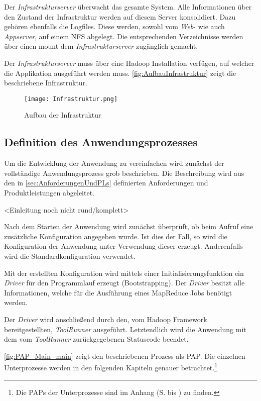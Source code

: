Der \textit{Infrastrukturserver} überwacht das gesamte System. Alle Informationen über den Zustand der Infrastruktur werden auf diesem Server konsolidiert. Dazu gehören ebenfalls die Logfiles. Diese werden, sowohl vom \textit{Web}- wie auch \textit{Appserver}, auf einem \ac{NFS} abgelegt. Die entsprechenden Verzeichnisse werden über einen mount dem \textit{Infrastrukturserver} zugänglich gemacht. 

Der \textit{Infrastrukturserver} muss über eine Hadoop Installation verfügen, auf welcher die Applikation ausgeführt werden muss. \autoref{fig:AufbauInfrastruktur} zeigt die beschriebene Infrastruktur. \\

\begin{figure}[h]
	\centering
	\texttt{[image: Infrastruktur.png]}
	\caption{Aufbau der Infrastruktur}
	\label{fig:AufbauInfrastruktur}
\end{figure}

\subsection{Definition des Anwendungsprozesses}
Um die Entwicklung der Anwendung zu vereinfachen wird zunächst der vollständige Anwendungsprozess grob beschrieben. Die Beschreibung wird aus den in \autoref{sec:AnforderungenUndPLs} definierten Anforderungen und Produktleistungen abgeleitet.

<Einleitung noch nicht rund/komplett>

Nach dem Starten der Anwendung wird zunächst überprüft, ob beim Aufruf eine zusätzliche Konfiguration angegeben wurde. Ist dies der Fall, so wird die Konfiguration der Anwendung unter Verwendung dieser erzeugt. Anderenfalls wird die Standardkonfiguration verwendet.

Mit der erstellten Konfiguration wird mittels einer Initialisierungsfunktion ein \textit{Driver} für den Programmlauf erzeugt (\gls{Bootstrapping}). Der \textit{Driver} besitzt alle Informationen, welche für die Ausführung eines MapReduce Jobs benötigt werden.

Der \textit{Driver} wird anschließend durch den, vom Hadoop Framework bereitgestellten, \textit{ToolRunner} ausgeführt. Letztendlich wird die Anwendung mit dem vom \textit{ToolRunner} zurückgegebenen Statuscode beendet.

\autoref{fig:PAP_Main_main} zeigt den beschriebenen Prozess als \ac{PAP}. Die einzelnen Unterprozesse werden in den folgenden Kapiteln genauer betrachtet.\footnote{Die \acp{PAP} der Unterprozesse sind im Anhang (S. \pageref{subsec:PAPMainMain} bis \pageref{subsec:PAPDriverRun}) zu finden.} \\

